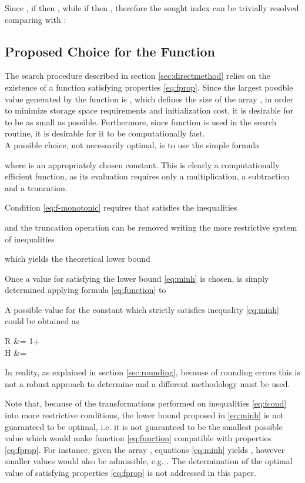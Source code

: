 \documentclass[preprint,1p,times]{elsarticle}
\begin{document}
Since , if  then , while if  then , therefore the sought index can be trivially resolved comparing  with :


\subsection{Proposed Choice for the Function }
\label{sec:constructf}
The search procedure described in section \ref{sec:directmethod} relies on the existence of a function  satisfying properties \eqref{eq:fprop}. Since the largest possible value generated by the function is , which defines the size of the array , in order to minimize storage space requirements and initialization cost, it is desirable for  to be as small as possible. Furthermore, since function  is used in the search routine, it is desirable for it to be computationally fast. \\

A possible choice, not necessarily optimal, is to use the simple formula

where  is an appropriately chosen constant.  This is clearly a computationally efficient function, as its evaluation requires only a multiplication, a subtraction and a truncation.

Condition \eqref{eq:f-monotonic} requires that  satisfies the inequalities

and the truncation operation can be removed writing the more restrictive system of inequalities

which yields the theoretical lower bound

Once a value for  satisfying the lower bound \eqref{eq:minh} is chosen,  is simply determined applying formula \eqref{eq:function} to 

A possible value for the constant  which strictly satisfies inequality \eqref{eq:minh} could be obtained as

\label{eq:rtheory}
	R &= 1+ \\
\label{eq:htheory}
        H &= 

In reality, as explained in section \ref{sec:rounding}, because of rounding errors this is not a robust approach to determine  and a different methodology must be used.

Note that, because of the transformations performed on inequalities \eqref{eq:fcond} into more restrictive conditions, the lower bound  proposed in \eqref{eq:minh} is not guaranteed to be optimal, i.e. it is not guaranteed to be the smallest possible value which would make function \eqref{eq:function} compatible with properties \eqref{eq:fprop}. For instance, given the array , equations \eqref{eq:minh} yields , however smaller values would also be admissible, e.g. . The determination of the optimal value of  satisfying properties \eqref{eq:fprop} is not addressed in this paper.
\end{document}

